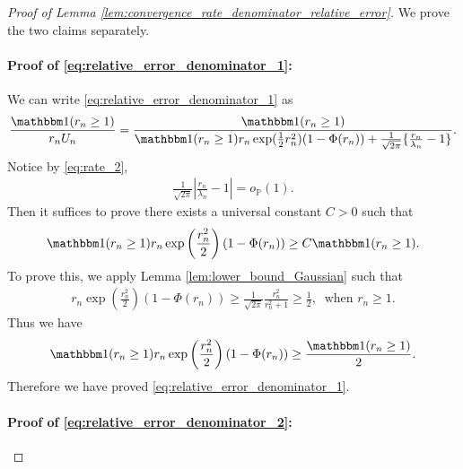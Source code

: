 \documentclass[12pt]{article}
\theoremstyle{definition}
\def\P{\mathbb{P}}
\def\P{\mathbb{P}}
\renewcommand{\P}{\mathbb{P}}							%
\newcommand{\indicator}{\mathbbm 1}						%
\begin{document}
	
\begin{proof}[Proof of Lemma \ref{lem:convergence_rate_denominator_relative_error}]
	We prove the two claims separately. 

	\paragraph{Proof of \eqref{eq:relative_error_denominator_1}:}
	We can write \eqref{eq:relative_error_denominator_1} as 
	\begin{align*}
		\frac{\indicator(r_n \geq 1)}{r_nU_n}=\frac{\indicator(r_n\geq 1)}{\indicator(r_n\geq 1)r_n\exp(\frac{1}{2}r_n^2)(1-\Phi(r_n))+\frac{1}{\sqrt{2\pi}}\{\frac{r_n}{\lambda_n}-1\}}.
	\end{align*}
	Notice by \eqref{eq:rate_2},
	\begin{align*}
		\frac{1}{\sqrt{2\pi}}\left|\frac{r_n}{\lambda_n}-1\right|=o_{\P}(1).
	\end{align*}
	Then it suffices to prove there exists a universal constant $C>0$ such that
	\begin{align*}
		\indicator(r_n\geq 1)r_n\exp\left(\frac{r_n^2}{2}\right)(1-\Phi(r_n))\geq C\indicator(r_n\geq 1).
	\end{align*}
	To prove this, we apply Lemma \ref{lem:lower_bound_Gaussian} such that 
	\begin{align*}
		r_n\exp\left(\frac{r_n^2}{2}\right)(1-\Phi(r_n))\geq \frac{1}{\sqrt{2\pi}}\frac{r_n^2}{r_n^2+1}\geq \frac{1}{2},\ \text{ when }r_n\geq 1.
	\end{align*}
	Thus we have 
	\begin{align*}
		\indicator(r_n\geq 1) r_n\exp\left(\frac{r_n^2}{2}\right)(1-\Phi(r_n))\geq \frac{\indicator(r_n\geq 1)}{2}.
	\end{align*}
	Therefore we have proved \eqref{eq:relative_error_denominator_1}.

	\paragraph{Proof of \eqref{eq:relative_error_denominator_2}:}


\end{proof}
\end{document}
